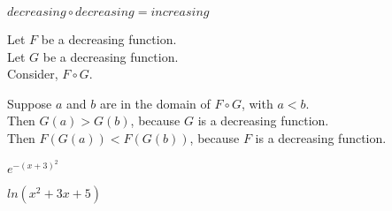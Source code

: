 \documentclass{ximera}
\begin{document}
\begin{fact}
$decreasing \circ decreasing = increasing$


Let $F$ be a decreasing function. \\
Let $G$ be a decreasing function. \\


Consider, $F \circ G$.

Suppose $a$ and $b$ are in the domain of $F \circ G$, with $a < b$. \\

Then $G(a) > G(b)$, because $G$ is a decreasing function. \\

Then $F(G(a)) < F(G(b))$, because $F$ is a decreasing function.


\end{fact}







\begin{example}   $e^{-(x+3)^2}$




\end{example}













\begin{example}   $ln(x^2 + 3x + 5)$




\end{example}
\end{document}
